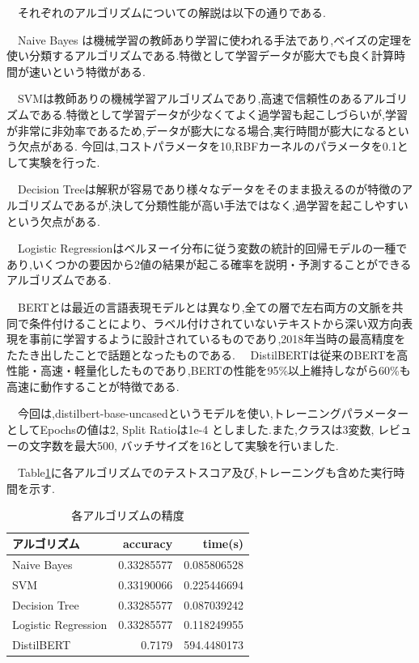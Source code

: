 \documentclass[twocolumn,dvipdfmx]{article}
\begin{document}
　それぞれのアルゴリズムについての解説は以下の通りである.
 
　Naive Bayes は機械学習の教師あり学習に使われる手法であり,ベイズの定理を使い分類するアルゴリズムである.特徴として学習データが膨大でも良く計算時間が速いという特徴がある.\cite{Naivebayse}

　SVMは教師ありの機械学習アルゴリズムであり,高速で信頼性のあるアルゴリズムである.特徴として学習データが少なくてよく過学習も起こしづらいが,学習が非常に非効率であるため,データが膨大になる場合,実行時間が膨大になるという欠点がある.\cite{SVM}
 今回は,コストパラメータを10,RBFカーネルのパラメータを0.1として実験を行った.

　Decision Treeは解釈が容易であり様々なデータをそのまま扱えるのが特徴のアルゴリズムであるが,決して分類性能が高い手法ではなく,過学習を起こしやすいという欠点がある.\cite{Decision Tree}
 
　Logistic Regressionはベルヌーイ分布に従う変数の統計的回帰モデルの一種であり,いくつかの要因から2値の結果が起こる確率を説明・予測することができるアルゴリズムである.
\cite{Logistic Regression}

　BERTとは最近の言語表現モデルとは異なり,全ての層で左右両方の文脈を共同で条件付けることにより、ラベル付けされていないテキストから深い双方向表現を事前に学習するように設計されているものであり,2018年当時の最高精度をたたき出したことで話題となったものである.\cite{BERT}
　DistilBERTは従来のBERTを高性能・高速・軽量化したものであり,BERTの性能を95\%以上維持しながら60\%も高速に動作することが特徴である.\cite{DistilBERT}
 
　今回は,distilbert-base-uncasedというモデルを使い,トレーニングパラメーターとしてEpochsの値は2, Split Ratioは1e-4 としました.また,クラスは3変数, レビューの文字数を最大500, バッチサイズを16として実験を行いました.
 
 
　Table\ref{seido}に各アルゴリズムでのテストスコア及び,トレーニングも含めた実行時間を示す.


\begin{table}[htbp] \centering
  \caption{各アルゴリズムの精度}
  \label{seido}
\begin{tabular}{lrr} \hline
   アルゴリズム & accuracy &  time(s) \\ \hline
   Naive Bayes &  0.33285577 & 0.085806528\\
   SVM & 0.33190066 & 0.225446694\\
   Decision Tree & 0.33285577 & 0.087039242\\
   Logistic Regression & 0.33285577 & 0.118249955\\ 
   DistilBERT & 0.7179 & 594.4480173 \\ \hline
\end{tabular}
\end{table}
\end{document}
